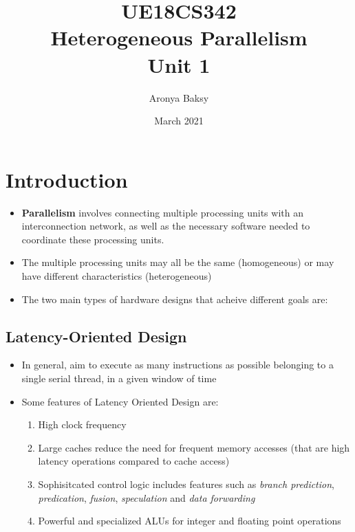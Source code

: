 \documentclass{article}
\title{UE18CS342 \\Heterogeneous Parallelism \\Unit 1}
\author{Aronya Baksy}
\date{March 2021}
\begin{document}
\maketitle

\section{Introduction}
\begin{itemize}
    \item \textbf{Parallelism} involves connecting multiple processing units with an interconnection network, as well as the necessary software needed to coordinate these processing units. 
    
    \item The multiple processing units may all be the same (homogeneous) or may have different characteristics (heterogeneous)
    
    \item The two main types of hardware designs that acheive different goals are:
\end{itemize}

\subsection{Latency-Oriented Design}
\begin{itemize}
    \item In general, aim to execute as many instructions as possible belonging to a single serial thread, in a given window of time
        
    \item Some features of Latency Oriented Design are:
    \begin{enumerate}
        \item High clock frequency
            
        \item Large caches reduce the need for frequent memory accesses (that are high latency operations compared to cache access)
            
        \item Sophisitcated control logic includes features such as \textit{branch prediction}, \textit{predication}, \textit{fusion}, \textit{speculation} and \textit{data forwarding}
            
        \item Powerful and specialized ALUs for integer and floating point operations
    \end{enumerate}
\end{itemize}
\end{document}
